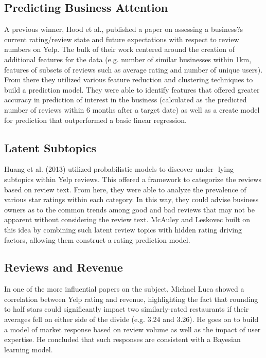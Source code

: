 \subsection{Predicting Business Attention}

A previous winner, Hood et al., published a paper on assessing a business?s current rating/review state and future expectations with respect to review numbers on Yelp. The bulk of their work centered around the creation of additional features for the data (e.g. number of similar businesses within 1km, features of subsets of reviews such as average rating and number of unique users). From there they utilized various feature reduction and clustering techniques to build a prediction model. They were able to identify features that offered greater accuracy in prediction of interest in the business (calculated as the predicted number of reviews within 6 months after a target date) as well as a create model for prediction that outperformed a basic linear regression.

\subsection{Latent Subtopics}

Huang et al. (2013) utilized probabilistic models to discover under- lying subtopics within Yelp reviews. This offered a framework to categorize the reviews based on review text. From here, they were able to analyze the prevalence of various star ratings within each category. In this way, they could advise business owners as to the common trends among good and bad reviews that may not be apparent without considering the review text. McAuley and Leskovec built on this idea by combining such latent review topics with hidden rating driving factors, allowing them construct a rating prediction model.

\subsection{Reviews and Revenue}

In one of the more influential papers on the subject, Michael Luca showed a correlation between Yelp rating and revenue, highlighting the fact that rounding to half stars could significantly impact two similarly-rated restaurants if their averages fell on either side of the divide (e.g. 3.24 and 3.26). He goes on to build a model of market response based on review volume as well as the impact of user expertise. He concluded that such responses are consistent with a Bayesian learning model.


